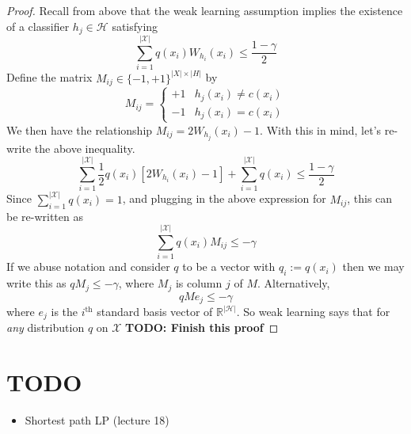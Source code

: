 \documentclass[12pt]{article}
\newcommand*{\abs}[1]{\left\lvert#1\right\rvert}
\newcommand{\R}{\mathcal{R}}
\def\R{\mathbb{R}}
\begin{document}
\begin{proof}
Recall from above that the weak learning assumption implies the existence of a classifier $h_j \in \mathcal{H}$ satisfying 
\[\sum_{i = 1}^{\abs{\mathcal{X}}} q(x_i) W_{h_i}(x_i) \leq \frac{1 - \gamma}{2}\]
Define the matrix $M_{ij} \in \{-1, +1\}^{\abs{X} \times \abs{H}}$ by 
\[M_{ij}  = \begin{cases} 
      +1 & h_j(x_i) \neq c(x_i) \\
      -1 & h_j(x_i) = c(x_i)
   \end{cases}
\]
We then have the relationship $M_{ij} = 2W_{h_j}(x_i) - 1$. With this in mind, let's re-write the above inequality. 
\[\sum_{i = 1}^{\abs{\mathcal{X}}} \frac{1}{2}q(x_i) \left[2W_{h_i}(x_i) - 1\right] + \sum_{i = 1}^{\abs{\mathcal{X}}} q(x_i) \leq \frac{1 - \gamma}{2}\]
Since $\sum_{i = 1}^{\abs{\mathcal{X}}} q(x_i) = 1$, and plugging in the above expression for $M_{ij}$, this can be re-written as
\[\sum_{i = 1}^{\abs{\mathcal{X}}} q(x_i)M_{ij} \leq -\gamma \]
If we abuse notation and consider $q$ to be a vector with $q_i := q(x_i)$ then we may write this as $qM_j \leq -\gamma$, where $M_j$ is column $j$ of $M$. Alternatively, 
\[qMe_j \leq -\gamma\]
where $e_j$ is the $i^{\text{th}}$ standard basis vector of $\R^{\abs{\mathcal{H}}}$. So weak learning says that for \textit{any} distribution $q$ on $\mathcal{X}$
\textbf{TODO: Finish this proof}
\end{proof}

	
\section{TODO}
\begin{itemize}
\item Shortest path LP (lecture 18)
\end{itemize}
	
	
\end{document}
